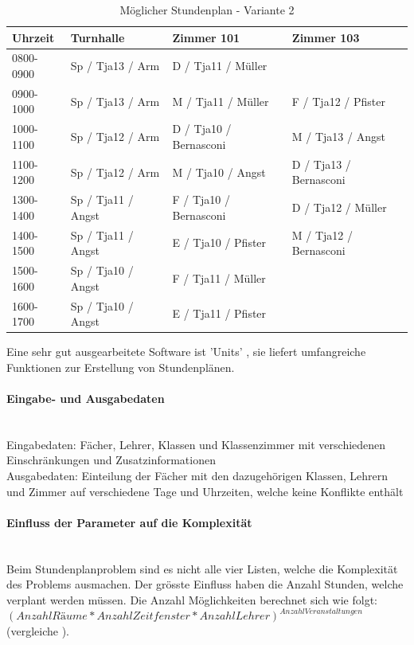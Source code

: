 \begin{table}[ht]
\centering
  \begin{tabular}{ l | l | l | l }
	\hline
	\rowcolor{gray}
	\textbf{Uhrzeit} 	& \textbf{Turnhalle}	& \textbf{Zimmer 101} 	& \textbf{Zimmer 103}	\\ \hline
	0800-0900		& Sp / Tja13 / Arm		& D / Tja11 / Müller		& 				\\ \hline
	0900-1000		& Sp / Tja13 / Arm		& M / Tja11 / Müller		& F / Tja12 / Pfister		\\ \hline
	1000-1100		& Sp / Tja12 / Arm		& D / Tja10 / Bernasconi	& M / Tja13 / Angst		\\ \hline
	1100-1200		& Sp / Tja12 / Arm		& M / Tja10 / Angst		& D / Tja13 / Bernasconi	\\ \hline \hline
	1300-1400		& Sp / Tja11 / Angst	& F / Tja10 / Bernasconi	& D / Tja12 / Müller		\\ \hline
	1400-1500		& Sp / Tja11 / Angst	& E / Tja10 / Pfister		& M / Tja12 / Bernasconi	\\ \hline
	1500-1600		& Sp / Tja10 / Angst	& F / Tja11 / Müller		& 				\\ \hline
	1600-1700		& Sp / Tja10 / Angst	& E / Tja11 / Pfister		& 				\\ \hline
  \end{tabular}
   \caption{Möglicher Stundenplan - Variante 2}\label{table:timetable_2}
\end{table}

\FloatBarrier
	Eine sehr gut ausgearbeitete Software ist 'Units' \cite{unit_express}, sie liefert umfangreiche Funktionen zur Erstellung von Stundenplänen.

	\paragraph{Eingabe- und Ausgabedaten}\mbox{}\\
	Eingabedaten: Fächer, Lehrer, Klassen und Klassenzimmer mit verschiedenen Einschränkungen und Zusatzinformationen\\
	Ausgabedaten: Einteilung der Fächer mit den dazugehörigen Klassen, Lehrern und Zimmer auf verschiedene Tage und Uhrzeiten, welche keine Konflikte enthält

	\paragraph{Einfluss der Parameter auf die Komplexität}\mbox{}\\
	Beim Stundenplanproblem sind es nicht alle vier Listen, welche die Komplexität des Problems ausmachen. Der grösste Einfluss haben die Anzahl Stunden, welche verplant werden 
	müssen. Die Anzahl Möglichkeiten berechnet sich wie folgt: $(Anzahl Räume * Anzahl Zeitfenster * Anzahl Lehrer)^{Anzahl Veranstaltungen}$ 
	(vergleiche \cite{scheduling_komplex}).

